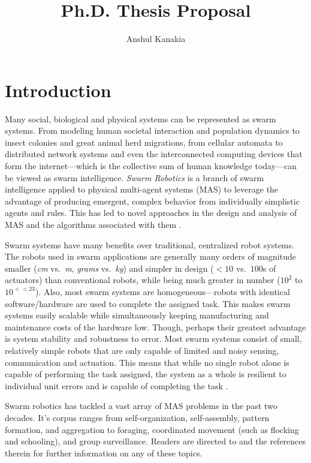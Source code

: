 \documentclass[11pt, onecolumn, compsoc, letterpaper]{article}
\begin{document}
\title{Ph.D. Thesis Proposal}
\author{Anshul Kanakia}

\maketitle

\section{Introduction}
Many social, biological and physical systems can be represented as swarm systems. From modeling human societal interaction and population dynamics to insect colonies and great animal herd migrations, from cellular automata to distributed network systems and even the interconnected computing devices that form the internet---which is the collective sum of human knowledge today---can be viewed as swarm intelligence. \emph{Swarm Robotics} \cite{Sahin2005} is a branch of swarm intelligence applied to physical multi-agent systems (MAS) to leverage the advantage of producing emergent, complex behavior from individually simplistic agents and rules. This has led to novel approaches in the design and analysis of MAS and the algorithms associated with them \cite{Brambilla2013}.

Swarm systems have many benefits over traditional, centralized robot systems. The robots used in swarm applications are generally many orders of magnitude smaller (\emph{cm} vs.~\emph{m}, \emph{grams} vs.~\emph{kg}) and simpler in design ($<10$ vs.~$100$s of actuators) than conventional robots, while being much greater in number ($10^2$ to $10^{<<23}$). Also, most swarm systems are homogeneous---robots with identical software/hardware are used to complete the assigned task. This makes swarm systems easily scalable while simultaneously keeping manufacturing and maintenance costs of the hardware low. Though, perhaps their greatest advantage is system stability and robustness to error. Most swarm systems consist of small, relatively simple robots that are only capable of limited and noisy sensing, communication and actuation. This means that while no single robot alone is capable of performing the task assigned, the system as a whole is resilient to individual unit errors and is capable of completing the task \cite{Winfield2005}.

Swarm robotics has tackled a vast array of MAS problems in the past two decades. It's corpus ranges from self-organization, self-assembly, pattern formation, and aggregation to foraging, coordinated movement (such as flocking and schooling), and group surveillance. Readers are directed to \cite{Bayindir2007} and the references therein for further information on any of these topics. 
\end{document}
